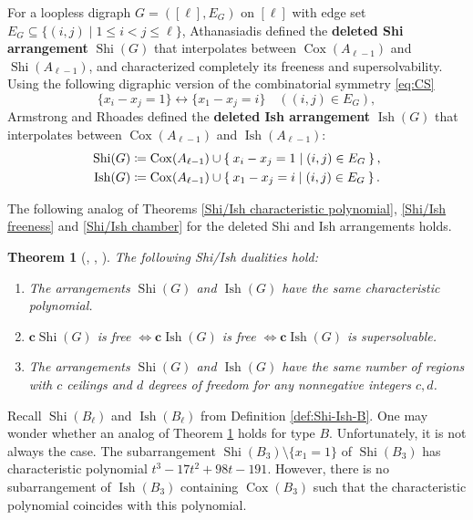 \documentclass[11pt]{article}
\newtheorem{theorem}[theo]{Theorem}
\theoremstyle{definition}
\numberwithin{equation}{section}
\DeclareMathOperator{\Cox}{Cox}
\DeclareMathOperator{\Shi}{Shi}
\DeclareMathOperator{\Ish}{Ish}
\newcommand{\cc}{\mathbf{c}}
\newcommand{\tbf}{\textbf}
\begin{document}
For a loopless digraph $G=([\ell],E_G)$ on $[\ell]$ with edge set $E_G \subseteq \{(i,j) \mid 1 \leq i < j \leq \ell\}$, Athanasiadis \cite{A96, Atha98} defined the \tbf{deleted Shi arrangement} $\Shi(G)$ that interpolates between $\Cox(A_{\ell-1})$ and  $\Shi(A_{\ell-1})$, and characterized completely its freeness and supersolvability. 
Using the following digraphic version of the combinatorial symmetry  \eqref{eq:CS}
\begin{equation*}
\label{eq:digraph-CS}
\{x_{i}-x_{j}= 1\} \longleftrightarrow \{ x_{1}-x_{j} = i\} \quad ((i,j) \in E_G),
\end{equation*}
Armstrong and Rhoades  \cite{AR12} defined the \tbf{deleted Ish arrangement} $\Ish(G)$ that interpolates between  $\Cox(A_{\ell-1})$ and $\Ish(A_{\ell-1})$:
\begin{equation}
\label{eq:GSI}
\begin{aligned}
  \Shi(G) & \coloneqq \Cox(A_{\ell-1})\cup  \Set{ x_{i}-x_{j}= 1 | (i,j) \in E_G }, \\
 \Ish(G) & \coloneqq \Cox(A_{\ell-1})\cup \Set{ x_{1}-x_{j} = i | (i,j) \in E_G }.
\end{aligned}
\end{equation}

The following analog of Theorems \ref{Shi/Ish characteristic polynomial}, \ref{Shi/Ish freeness} and \ref{Shi/Ish chamber} for the deleted Shi and Ish arrangements holds.

\begin{theorem}[{\cite[Main Theorem]{AR12}, \cite[Theorem 6]{LRW14}, \cite[Corollary 5.3]{AST17}}]
\label{thm:GSI}
The following Shi/Ish dualities hold: 
\begin{enumerate}[(1)]
\item The arrangements $\Shi(G)$ and $\Ish(G)$ have the same characteristic polynomial. 
\item $\tbf{c} \Shi(G)$ is free $\Leftrightarrow \cc\Ish(G)$ is free $\Leftrightarrow \cc\Ish(G)$ is supersolvable. 
\item The arrangements $\Shi(G)$ and $\Ish(G)$ have the same number of regions with $c$ ceilings and $d$ degrees of freedom for any nonnegative integers $c,d$.
\end{enumerate}
\end{theorem}

Recall $\Shi(B_{\ell})$ and $\Ish(B_{\ell})$  from Definition \ref{def:Shi-Ish-B}. 
One may wonder whether an analog of Theorem \ref{thm:GSI} holds for type $B$. 
Unfortunately, it is not always the case. 
The subarrangement $\Shi(B_{3})\setminus\{x_{1}=1\}$ of $\Shi(B_{3})$ has characteristic polynomial  $t^{3}-17t^{2}+98t-191$. 
However, there is no subarrangement of $\Ish(B_{3})$ containing $\Cox(B_{3})$ such that the characteristic polynomial coincides with this polynomial. 
\end{document}
